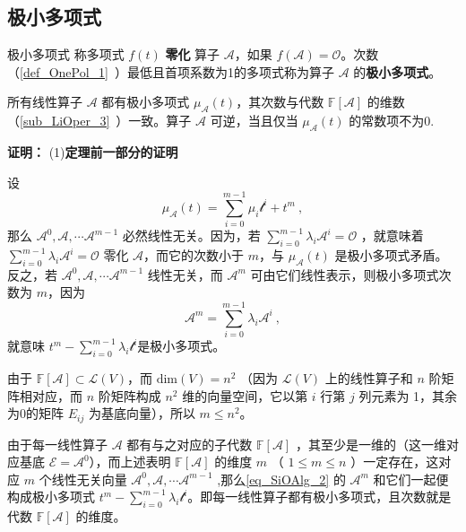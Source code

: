\subsection{极小多项式}
\begin{definition}{极小多项式}
称多项式 $f(t)$ \textbf{零化} 算子 $\mathcal{A}$，如果 $f(\mathcal{A})=\mathcal O$。次数（\autoref{def_OnePol_1}~）最低且首项系数为1的多项式称为算子 $\mathcal{A}$ 的\textbf{极小多项式}。
\end{definition}
\begin{theorem}{}
所有线性算子 $\mathcal{A}$ 都有极小多项式 $\mu_\mathcal{A}(t)$，其次数与代数 $\mathbb{F}[\mathcal{A}]$ 的维数（\autoref{sub_LiOper_3}~）一致。算子 $\mathcal{A}$ 可逆，当且仅当 $\mu_\mathcal{A}(t)$ 的常数项不为0.
\end{theorem}
\textbf{证明：}
(1)\textbf{定理前一部分的证明}

设
\begin{equation}
\mu_\mathcal{A}(t)=\sum_{i=0}^{m-1}\mu_i\mathcal t^i+t^m~,
\end{equation}
那么 $\mathcal{A}^0,\mathcal{A},\cdots \mathcal{A}^{m-1}$ 必然线性无关。因为，若 $\sum\limits_{i=0}^{m-1}\lambda_i\mathcal{A}^i=\mathcal{O}$ ，就意味着 $\sum\limits_{i=0}^{m-1}\lambda_i\mathcal{A}^i=\mathcal{O}$ 零化 $\mathcal A$，而它的次数小于 $m$，与 $\mu_\mathcal{A}(t)$ 是极小多项式矛盾。反之，若 $\mathcal{A}^0,\mathcal{A},\cdots \mathcal{A}^{m-1}$ 线性无关，而 $\mathcal{A}^m$ 可由它们线性表示，则极小多项式次数为 $m$，因为
\begin{equation}\label{eq_SiOAlg_2}
\mathcal A^m=\sum_{i=0}^{m-1}\lambda_i\mathcal A^i~,
\end{equation}
就意味 $t^m-\sum\limits_{i=0}^{m-1}\lambda_i\mathcal t^i$是极小多项式。

由于 $\mathbb{F}[\mathcal{A}]\subset\mathcal{L}(V)$，而 $\mathrm{dim}(V)=n^2$ （因为 $\mathcal{L}(V)$ 上的线性算子和 $n$ 阶矩阵相对应，而 $n$ 阶矩阵构成 $n^2$ 维的向量空间，它以第 $i$ 行第 $j$ 列元素为 1，其余为0的矩阵 $E_{ij}$ 为基底向量），所以 $m\leq n^2$。

由于每一线性算子 $\mathcal A$ 都有与之对应的子代数 $\mathbb{F}[\mathcal A]$ ，其至少是一维的（这一维对应基底 $\mathcal{E=A}^0$），而上述表明 $\mathbb{F}[\mathcal A]$ 的维度 $m$ （ $1\leq m\leq n$ ）一定存在，这对应 $m$ 个线性无关向量 $\mathcal{A}^0,\mathcal{A},\cdots \mathcal{A}^{m-1}$ ,那么\autoref{eq_SiOAlg_2} 的 $\mathcal A^m$ 和它们一起便构成极小多项式 $t^m-\sum\limits_{i=0}^{m-1}\lambda_i\mathcal t^i$。即每一线性算子都有极小多项式，且次数就是代数 $\mathbb{F}[\mathcal{A}]$ 的维度。


